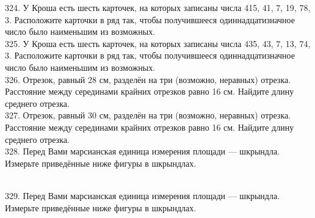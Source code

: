 \documentclass[12pt]{article}
\begin{document}
324. У Кроша есть шесть карточек, на которых записаны числа 415, 41, 7, 19, 78, 3. Расположите карточки в ряд так, чтобы получившееся одиннадцатизначное число было наименьшим из возможных.\\
325. У Кроша есть шесть карточек, на которых записаны числа 435, 43, 7, 13, 74, 3. Расположите карточки в ряд так, чтобы получившееся одиннадцатизначное число было наименьшим из возможных.\\
326. Отрезок, равный 28 см, разделён на три (возможно, неравных) отрезка. Расстояние между серединами крайних отрезков равно 16 см. Найдите длину среднего отрезка.\\
327. Отрезок, равный 30 см, разделён на три (возможно, неравных) отрезка. Расстояние между серединами крайних отрезков равно 16 см. Найдите длину среднего отрезка.\\
328. Перед Вами марсианская единица измерения площади --- шкрындла. Измерьте приведённые ниже фигуры в
шкрындлах.\\
\begin{figure}[ht!]
\end{figure}\\
329. Перед Вами марсианская единица измерения площади --- шкрындла. Измерьте приведённые ниже фигуры в
шкрындлах.\\
\begin{figure}[ht!]
\end{figure}\\
\end{document}
